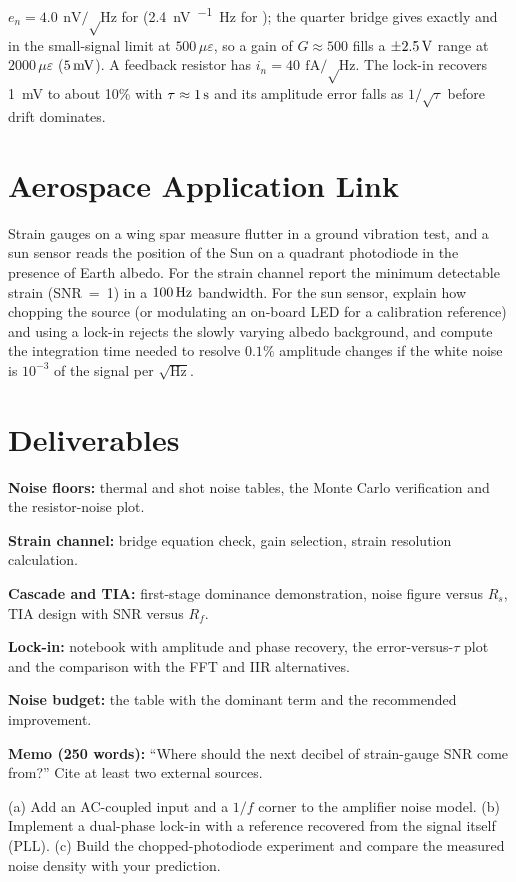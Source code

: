 \documentclass[11pt,a4paper]{article}
\begin{document}
\begin{checkpoint}
$e_n=\SI{4.0}{\nano\volt\per\sqrt\hertz}$ for  (\SI{2.4}{\nano\volt\per\sqrt\hertz} for ); the quarter bridge gives  exactly and  in the small-signal limit at $500\,\mu\varepsilon$, so a gain of $G\approx500$ fills a $\pm\SI{2.5}{\volt}$ range at $2000\,\mu\varepsilon$ ($\SI{5}{\milli\volt}$). A  feedback resistor has $i_n=\SI{40}{\femto\ampere\per\sqrt\hertz}$. The lock-in recovers \SI{1}{\milli\volt} to about 10\% with $\tau\approx\SI{1}{\second}$ and its amplitude error falls as $1/\sqrt\tau$ before drift dominates.
\end{checkpoint}

\section*{Aerospace Application Link}
Strain gauges on a wing spar measure flutter in a ground vibration test, and a sun sensor reads the position of the Sun on a quadrant photodiode in the presence of Earth albedo. For the strain channel report the minimum detectable strain (SNR~=~1) in a $\SI{100}{\hertz}$ bandwidth. For the sun sensor, explain how chopping the source (or modulating an on-board LED for a calibration reference) and using a lock-in rejects the slowly varying albedo background, and compute the integration time needed to resolve $0.1\%$ amplitude changes if the white noise is $10^{-3}$ of the signal per $\sqrt{\mathrm{Hz}}$.

\section*{Deliverables}
\begin{delivs}
  \item[D1] \textbf{Noise floors:} thermal and shot noise tables, the Monte Carlo verification and the resistor-noise plot.
  \item[D2] \textbf{Strain channel:} bridge equation check, gain selection, strain resolution calculation.
  \item[D3] \textbf{Cascade and TIA:} first-stage dominance demonstration, noise figure versus $R_s$, TIA design with SNR versus $R_f$.
  \item[D4] \textbf{Lock-in:} notebook with amplitude and phase recovery, the error-versus-$\tau$ plot and the comparison with the FFT and IIR alternatives.
  \item[D5] \textbf{Noise budget:} the table with the dominant term and the recommended improvement.
  \item[D6] \textbf{Memo (250 words):} ``Where should the next decibel of strain-gauge SNR come from?'' Cite at least two external sources.
  \item[Bonus] (a) Add an AC-coupled input and a $1/f$ corner to the amplifier noise model. (b) Implement a dual-phase lock-in with a reference recovered from the signal itself (PLL). (c) Build the chopped-photodiode experiment and compare the measured noise density with your prediction.
\end{delivs}
\end{document}
